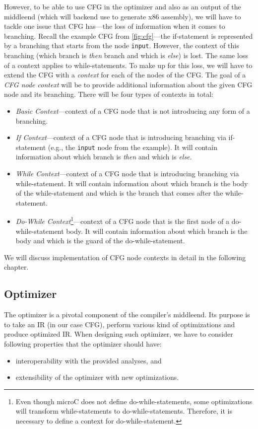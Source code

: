 \documentclass[thesis=M,english]{FITthesis}[2019/12/23]
\begin{document}
However, to be able to use CFG in the optimizer and also as an output of the middleend (which will backend use to generate x86 assembly), we will have to tackle one issue that CFG has---the loss of information when it comes to branching. Recall the example CFG from \autoref{fig:cfg}---the if-statement is represented by a branching that starts from the node \texttt{input}. However, the context of this branching (which branch is \emph{then} branch and which is \emph{else}) is lost. The same loss of a context applies to while-statements. To make up for this loss, we will have to extend the CFG with a \emph{context} for each of the nodes of the CFG. The goal of a \emph{CFG node context} will be to provide additional information about the given CFG node and its branching. There will be four types of contexts in total:
\begin{itemize}
    \item \emph{Basic Context}---context of a CFG node that is not introducing any form of a branching.
    \item \emph{If Context}---context of a CFG node that is introducing branching via if-statement (e.g., the \texttt{input} node from the example). It will contain information about which branch is \emph{then} and which is \emph{else}.
    \item \emph{While Context}---context of a CFG node that is introducing branching via while-statement. It will contain information about which branch is the body of the while-statement and which is the branch that comes after the while-statement.
    \item \emph{Do-While Context}\footnote{Even though microC does not define do-while-statements, some optimizations will transform while-statements to do-while-statements. Therefore, it is necessary to define a context for do-while-statement.}---context of a CFG node that is the first node of a do-while-statement body. It will contain information about which branch is the body and which is the guard of the do-while-statement.
\end{itemize}

We will discuss implementation of CFG node contexts in detail in the following chapter.

\subsection{Optimizer}\label{ssec:optimizer}
The optimizer is a pivotal component of the compiler's middleend. Its purpose is to take an IR (in our case CFG), perform various kind of optimizations and produce optimized IR. When designing such optimizer, we have to consider following properties that the optimizer should have:
\begin{itemize}
    \item interoperability with the provided analyses, and
    \item extensibility of the optimizer with new optimizations.
\end{itemize}
\end{document}
